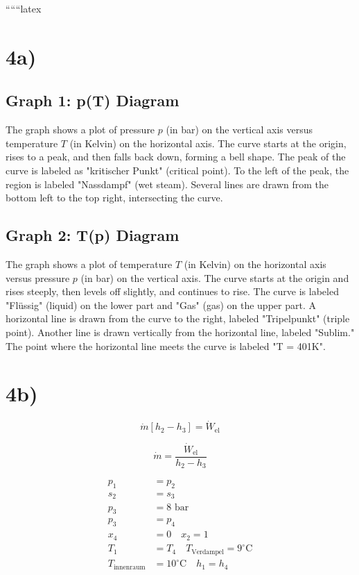 
``````latex


\section*{4a)}

\subsection*{Graph 1: p(T) Diagram}
The graph shows a plot of pressure \( p \) (in bar) on the vertical axis versus temperature \( T \) (in Kelvin) on the horizontal axis. The curve starts at the origin, rises to a peak, and then falls back down, forming a bell shape. The peak of the curve is labeled as "kritischer Punkt" (critical point). To the left of the peak, the region is labeled "Nassdampf" (wet steam). Several lines are drawn from the bottom left to the top right, intersecting the curve.

\subsection*{Graph 2: T(p) Diagram}
The graph shows a plot of temperature \( T \) (in Kelvin) on the horizontal axis versus pressure \( p \) (in bar) on the vertical axis. The curve starts at the origin and rises steeply, then levels off slightly, and continues to rise. The curve is labeled "Flüssig" (liquid) on the lower part and "Gas" (gas) on the upper part. A horizontal line is drawn from the curve to the right, labeled "Tripelpunkt" (triple point). Another line is drawn vertically from the horizontal line, labeled "Sublim." The point where the horizontal line meets the curve is labeled "T = 401K".

\section*{4b)}

\[
\dot{m} \left[ h_2 - h_3 \right] = \dot{W}_{\text{el}}
\]

\[
\dot{m} = \frac{\dot{W}_{\text{el}}}{h_2 - h_3}
\]

\begin{align*}
p_1 &= p_2 \\
s_2 &= s_3 \\
p_3 &= 8 \text{ bar} \\
p_3 &= p_4 \\
x_4 &= 0 \quad x_2 = 1 \\
T_1 &= T_4 \quad T_{\text{Verdampel}} = 9^\circ \text{C} \\
T_{\text{innenraum}} &= 10^\circ \text{C} \quad h_1 = h_4
\end{align*}

